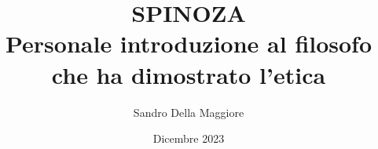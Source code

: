 \documentclass[b5paper,12pt,oneside,openany]{book}%
\begin{document}
	\author{Sandro Della Maggiore}
	\title{\Huge SPINOZA\\{\Large Personale introduzione al filosofo che ha dimostrato l'etica}}
	\date{Dicembre 2023}

	\maketitle

		

	
		
	
	
	
	
	

	

	
\end{document}
